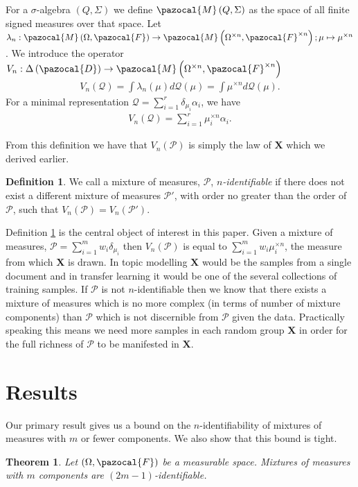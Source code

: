 \documentclass{article} %
\def\sF{\pazocal{F}}
\def\sM{\pazocal{M}}
\def\sD{\pazocal{D}}
\def\sP{\mathscr{P}}
\def\sQ{\mathscr{Q}}
\def\bX{\mathbf{X}}
\def\dd{\Delta\left( \sD \right)}
\newtheorem{thm}{Theorem}
\theoremstyle{definition}
\newtheorem{defin}{Definition}
\begin{document}
For a $\sigma$-algebra $\left(Q, \Sigma \right)$ we define $\sM \left(Q, \Sigma \right)$ as the space of all finite signed measures over that space. Let $\lambda_n:\sM\left( \Omega, \sF \right) \to \sM\left( \Omega^{\times n}, \sF^{\times n}\right);\mu \mapsto \mu^{\times n}$. We introduce the operator $V_n:\dd\to \sM\left( \Omega^{\times n}, \sF^{\times n} \right)$
\begin{eqnarray*}
	V_n(\sQ) = \int \lambda_n(\mu) d\sQ\left( \mu \right)= \int \mu^{\times n} d\sQ\left( \mu \right).
\end{eqnarray*}
For a minimal representation $\sQ =\sum_{i=1}^r \delta_{\mu_i} \alpha_i$, we have
\begin{eqnarray*}
	V_n(\sQ) =\sum_{i=1}^r \mu_i^{\times n} \alpha_i.
\end{eqnarray*}

From this definition we have that $V_n\left( \sP \right)$ is simply the law of $\bX$ which we derived earlier.

\begin{defin}\label{def:ident}
	We call a mixture of measures, $\sP$, \emph{$n$-identifiable} if there does not exist a different mixture of measures $\sP'$, with order no greater than the order of $\sP$, such that $V_n\left( \sP \right) = V_n\left( \sP' \right)$.
\end{defin}

Definition \ref{def:ident} is the central object of interest in this paper. Given a mixture of measures, $\sP = \sum_{i=1}^m w_i\delta_{\mu_i}$ then $V_n(\sP)$ is equal to $\sum_{i=1}^m w_i \mu_i^{\times n}$, the measure from which $\bX$ is drawn. In topic modelling $\bX$ would be the samples from a single document and in transfer learning it would  be one of the several collections of training samples. If $\sP$ is not $n$-identifiable then we know that there exists a mixture of measures which is no more complex (in terms of number of mixture components) than $\sP$ which is not discernible from $\sP$ given the data. Practically speaking this means we need more samples in each random group $\bX$ in order for the full richness of $\sP$ to be manifested in $\bX$.
\section{Results}
Our primary result gives us a bound on the $n$-identifiability of mixtures of measures with $m$ or fewer components. We also show that this bound is tight.
\begin{thm} \label{thm:ident}
	Let $\left( \Omega,\sF \right)$ be a measurable space. Mixtures of measures with $m$ components are $(2m-1)$-identifiable.
\end{thm}
\end{document}
